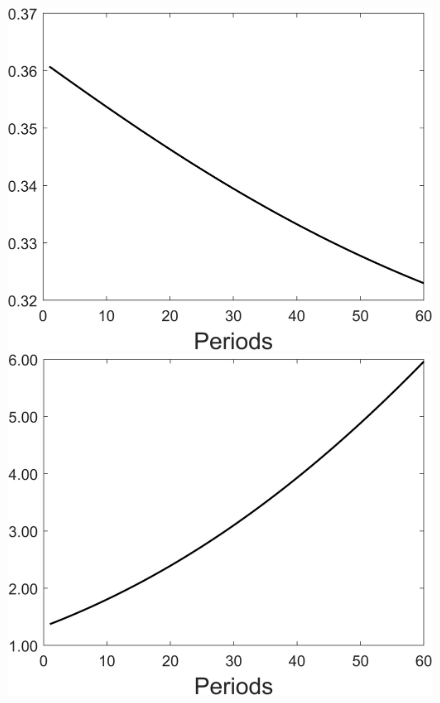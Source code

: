 \begin{figure}[h!!]
\begin{minipage}[]{0.32\textwidth}
	\end{minipage}
	\begin{minipage}[]{0.32\textwidth}
		\includegraphics[width=1\textwidth]{../codding_model/Own/figures/Rep_agent/staticonlyRam_separate_hl_periods59_eppsilon0.40_zeta1.40_Ad08_Ac04_thetac0.70_thetad0.56_HetGrowth1_tauul0.181_util0_withtarget0_lgd0.png}
	\end{minipage}
	\begin{minipage}[]{0.32\textwidth}
		\includegraphics[width=1\textwidth]{../codding_model/Own/figures/Rep_agent/staticonlyRam_separate_yc_periods59_eppsilon0.40_zeta1.40_Ad08_Ac04_thetac0.70_thetad0.56_HetGrowth1_tauul0.181_util0_withtarget0_lgd0.png}

\end{minipage}
\end{figure}
